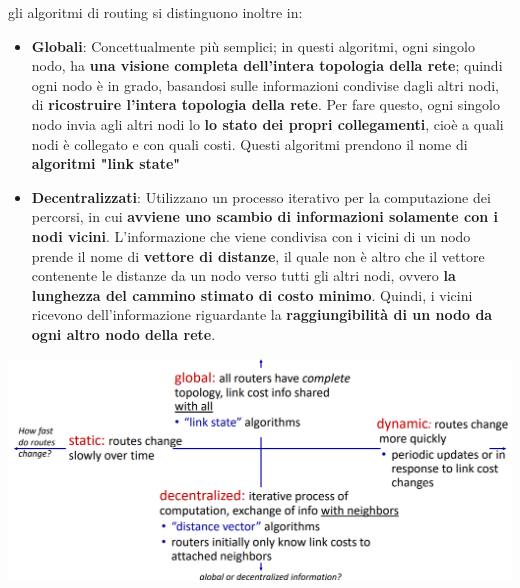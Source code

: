 \documentclass[12pt]{article}
\begin{document}
gli algoritmi di routing si distinguono inoltre in:
\begin{itemize}
    \item \textbf{Globali}: Concettualmente più semplici; in questi algoritmi, ogni singolo nodo, ha \textbf{una visione completa dell'intera topologia della rete}; quindi ogni nodo è in grado, basandosi sulle informazioni condivise dagli altri nodi, di \textbf{ricostruire l'intera topologia della rete}.
    Per fare questo, ogni singolo nodo invia agli altri nodi lo \textbf{lo stato dei propri collegamenti}, cioè a quali nodi è collegato e con quali costi. Questi algoritmi prendono il nome di \textbf{algoritmi "link state"}
    \item \textbf{Decentralizzati}: Utilizzano un processo iterativo per la computazione dei percorsi, in cui \textbf{avviene uno scambio di informazioni solamente con i nodi vicini}. L'informazione che viene condivisa con i vicini di un nodo prende il nome di \textbf{vettore di distanze}, il quale non è altro che il vettore contenente le distanze da un nodo verso tutti gli altri nodi,
    ovvero \textbf{la lunghezza del cammino stimato di costo minimo}. Quindi, i vicini ricevono dell'informazione riguardante la \textbf{raggiungibilità di un nodo da ogni altro nodo della rete}.
\end{itemize} 
\begin{center}
    \includegraphics[width =1\linewidth]{Images/98.png}
\end{center}
\end{document}
